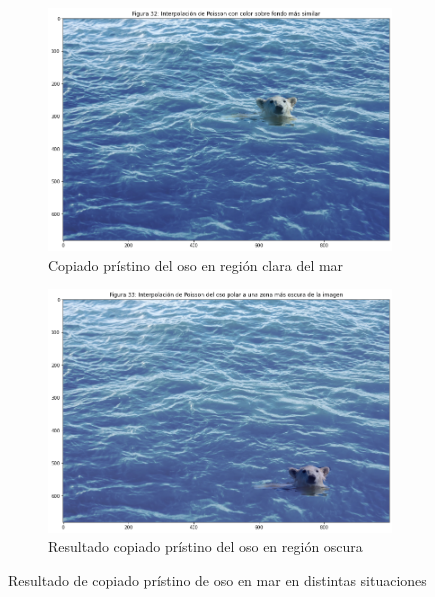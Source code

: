 \documentclass[11pt,twoside,titlepage,a4paper]{article}
\numberwithin{equation}{section} %
\theoremstyle{usual}
\begin{document}
\begin{figure}[h]
    \centering
    \begin{subfigure}[b]{.45\textwidth}
        \centering
        \includegraphics[width=\textwidth]{imagenes/PoissonImageEditing_cell_40_output_2.png}
        \caption{Copiado prístino del oso en región clara del mar}
        \label{fig:copiadoPristinoOsoPolar1}
    \end{subfigure}%
    \begin{subfigure}[b]{.45\textwidth}
        \centering
        \includegraphics[width=\textwidth]{imagenes/PoissonImageEditing_cell_42_output_0.png}
        \caption{Resultado copiado prístino del oso en región oscura}
        \label{fig:copiadoPristinoOsoPolar2}
    \end{subfigure}
    \caption{Resultado de copiado prístino de oso en mar en distintas situaciones}
    \label{fig:copiadoPristinoOsoPolarYMar}
\end{figure}
\end{document}
